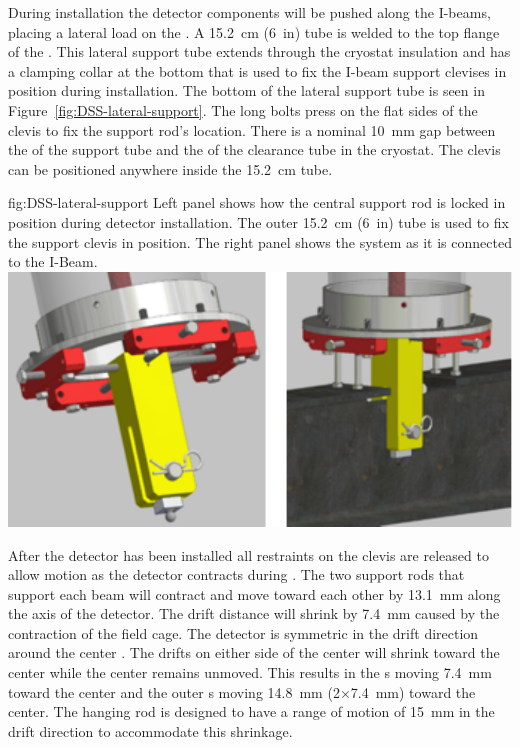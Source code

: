 During installation the detector components will be pushed along the  I-beams, placing a lateral load on the . %
A \SI{15.2}{cm} (\SI{6}{in})   tube is welded to the top flange of the  \fdth{}. 
This lateral support tube  extends through the cryostat insulation and has a clamping collar at the bottom that is used to fix the I-beam support clevises in position during installation. 
The bottom of the lateral support tube is seen in Figure~\ref{fig:DSS-lateral-support}. 
The long bolts press on the flat sides of the clevis to fix the support rod's location. 
There is a nominal \SI{10}{mm} gap between the  of the support tube and the  of the clearance tube in the cryostat. 
The clevis can be positioned anywhere inside the \SI{15.2}{cm} tube.




\begin{dunefigure}{fig:DSS-lateral-support}
  {Left panel shows how the central support rod is locked in position during detector installation. The outer  \SI{15.2}{cm} (\SI{6}{in}) tube is used to fix the support clevis in position. The right panel shows the system as it is connected to the I-Beam.}
\includegraphics[width=.75\textwidth]{graphics/dss-lateral-support.pdf}
\end{dunefigure}

After the detector has been installed all restraints on the clevis are released to allow motion as the detector contracts during \cooldown.  The two support rods that support each  beam will contract and move toward each other by \SI{13.1}{mm} along the axis of the detector.  
The drift distance will shrink by \SI{7.4}{mm}  caused by the contraction of the field cage.  The detector is symmetric in the drift direction around the center .  The drifts on either side of the center  will  shrink toward the center while the center  remains unmoved.  This results in the s moving \SI{7.4}{mm}  toward the center and the outer s moving \SI{14.8}{mm}  (2$\times$\SI{7.4}{mm}) toward the center.  The hanging rod is designed to have a range of motion of \SI{15}{mm}  in the drift direction to accommodate this shrinkage.




